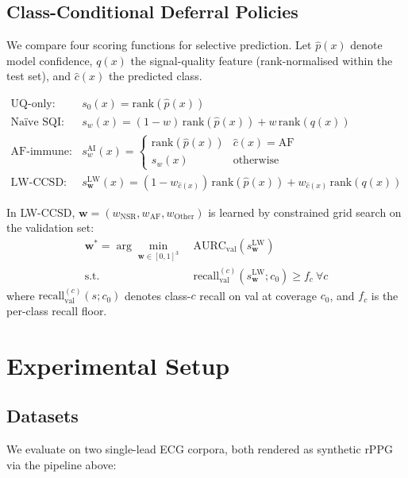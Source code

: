 \documentclass[journal]{IEEEtran}
\begin{document}
\subsection{Class-Conditional Deferral Policies}
We compare four scoring functions for selective prediction. Let $\hat{p}(x)$ denote model confidence, $q(x)$ the signal-quality feature (rank-normalised within the test set), and $\hat{c}(x)$ the predicted class.

\begin{align}
\text{UQ-only:}\quad & s_0(x) = \text{rank}(\hat{p}(x)) \\
\text{Na\"{i}ve SQI:}\quad & s_w(x) = (1-w)\,\text{rank}(\hat{p}(x)) + w\,\text{rank}(q(x)) \\
\text{AF-immune:}\quad & s_w^{\text{AI}}(x) =
  \begin{cases}
    \text{rank}(\hat{p}(x)) & \hat{c}(x) = \text{AF} \\
    s_w(x) & \text{otherwise}
  \end{cases} \\
\text{LW-CCSD:}\quad & s_{\mathbf{w}}^{\text{LW}}(x) = (1-w_{\hat{c}(x)})\,\text{rank}(\hat{p}(x)) + w_{\hat{c}(x)}\,\text{rank}(q(x))
\end{align}

In LW-CCSD, $\mathbf{w} = (w_{\text{NSR}}, w_{\text{AF}}, w_{\text{Other}})$ is learned by constrained grid search on the validation set:
\begin{align}
\mathbf{w}^{*} = \arg\min_{\mathbf{w} \in [0,1]^3}\ &\text{AURC}_{\text{val}}(s_{\mathbf{w}}^{\text{LW}}) \\
\text{s.t.}\quad & \text{recall}_{\text{val}}^{(c)}(s_{\mathbf{w}}^{\text{LW}}; c_0) \geq f_c\ \forall c
\end{align}
where $\text{recall}_{\text{val}}^{(c)}(s; c_0)$ denotes class-$c$ recall on val at coverage $c_0$, and $f_c$ is the per-class recall floor.

\section{Experimental Setup}
\subsection{Datasets}
We evaluate on two single-lead ECG corpora, both rendered as synthetic rPPG via the pipeline above:
\end{document}
